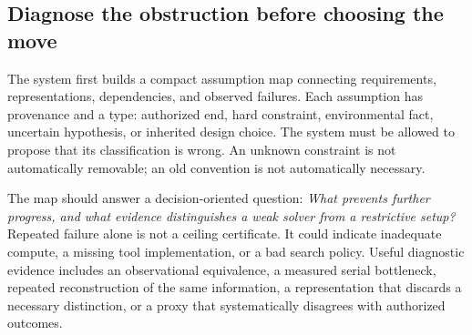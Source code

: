 \documentclass[11pt,letterpaper]{article}
\theoremstyle{remark}\newtheorem{remark}{Remark}[section]
\begin{document}
\subsection{Diagnose the obstruction before choosing the move}
The system first builds a compact assumption map connecting requirements, representations, dependencies, and observed failures. Each assumption has provenance and a type: authorized end, hard constraint, environmental fact, uncertain hypothesis, or inherited design choice. The system must be allowed to propose that its classification is wrong. An unknown constraint is not automatically removable; an old convention is not automatically necessary.

The map should answer a decision-oriented question: \emph{What prevents further progress, and what evidence distinguishes a weak solver from a restrictive setup?} Repeated failure alone is not a ceiling certificate. It could indicate inadequate compute, a missing tool implementation, or a bad search policy. Useful diagnostic evidence includes an observational equivalence, a measured serial bottleneck, repeated reconstruction of the same information, a representation that discards a necessary distinction, or a proxy that systematically disagrees with authorized outcomes.
\end{document}

